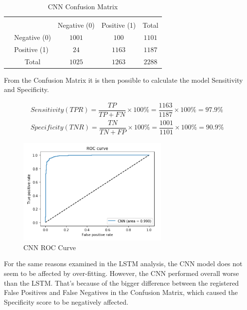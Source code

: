 
{
\begin{table}[h!]
\centering
\begin{tabular}{l|l|c|c|c}
\multicolumn{2}{c}{}&\multicolumn{2}{c}{}&\\
\cline{3-4}
\multicolumn{2}{c|}{}&Negative (0)&Positive (1)&\multicolumn{1}{c}{Total}\\
\cline{2-4}
\multirow{}{}{}& Negative (0) & $1001$ & $100$ & $1101$\\
\cline{2-4}
& Positive (1) & $24$ & $1163$ & $1187$\\
\cline{2-4}
\multicolumn{1}{c}{} & \multicolumn{1}{c}{Total} & \multicolumn{1}{c}{$1025$} & \multicolumn{    1}{c}{$1263$} & \multicolumn{1}{c}{$2288$}\\
\end{tabular}
\caption{CNN Confusion Matrix}
\label{table:1}
\end{table}
}


From the Confusion Matrix it is then possible to calculate the model Sensitivity and Specificity.

\begin{align}
\ Sensitivity (TPR) = \dfrac{TP}{TP + FN}\times100\% = \dfrac{1163}{1187}\times100\% = 97.9\% \label{eq:1} 
\\
\ Specificity (TNR)  = \dfrac{TN}{TN + FP}\times100\%
= \dfrac{1001}{1101}\times100\% = 90.9\% 
\end{align}

\begin{figure}[ht!]%
    \centering
    \includegraphics[width=7.5cm]{images/cnnorc.PNG}%
    \caption{CNN ROC Curve}
\end{figure}

For the same reasons examined in the LSTM analysis, the CNN model does not seem to be affected by over-fitting. However, the CNN performed overall worse than the LSTM. That's because of the bigger difference between the registered False Positives and False Negatives in the Confusion Matrix, which caused the Specificity score to be negatively affected.


